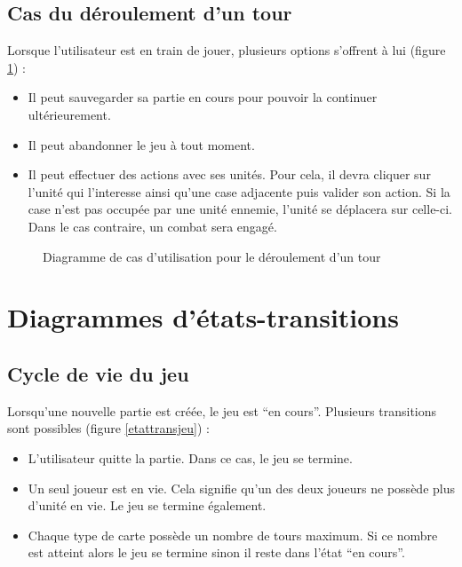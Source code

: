 \documentclass[a4paper]{article}
\begin{document}
\subsection{Cas du déroulement d'un tour}

Lorsque l’utilisateur est en train de jouer, plusieurs options s’offrent à lui (figure \ref{usecaseround}) :

\begin{itemize}\renewcommand{\labelitemi}{$\bullet$}
	\item Il peut sauvegarder sa partie en cours pour pouvoir la continuer ultérieurement.
    \item Il peut abandonner le jeu à tout moment.
    \item Il peut effectuer des actions avec ses unités. Pour cela, il devra cliquer sur l’unité qui l’interesse ainsi qu’une case adjacente puis valider son action. Si la case n’est pas occupée par une unité ennemie, l’unité se déplacera sur celle-ci. Dans le cas contraire, un combat sera engagé.
\end{itemize}

\begin{figure}[!h] 
  \begin{center}
    \caption{Diagramme de cas d'utilisation pour le déroulement d'un tour} 
    \label{usecaseround} 
  \end{center}
\end{figure}

\newpage

\section{Diagrammes d’états-transitions}

\subsection{Cycle de vie du jeu}

Lorsqu’une nouvelle partie est créée, le jeu est “en cours”. Plusieurs transitions sont possibles (figure \ref{etattransjeu}) :
\begin{itemize}\renewcommand{\labelitemi}{$\bullet$}
	\item L’utilisateur quitte la partie. Dans ce cas, le jeu se termine.
	\item Un seul joueur est en vie. Cela signifie qu’un des deux joueurs ne possède plus d’unité en vie. Le jeu se termine également.
	\item Chaque type de carte possède un nombre de tours maximum. Si ce nombre est atteint alors le jeu se termine sinon il reste dans l’état “en cours”.
\end{itemize}
\end{document}
